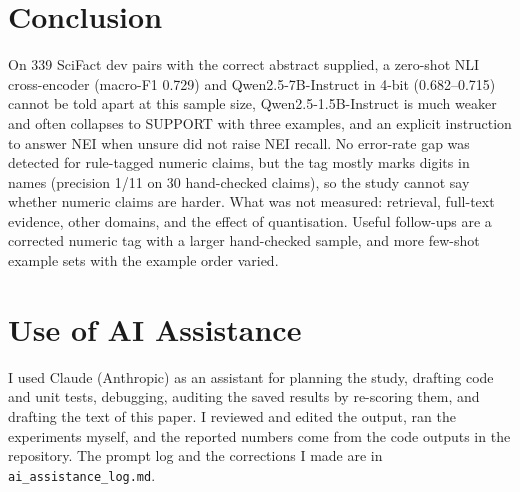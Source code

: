 \documentclass[conference]{IEEEtran}
\begin{document}
\section{Conclusion}
On 339 SciFact dev pairs with the correct abstract supplied, a zero-shot NLI cross-encoder (macro-F1 0.729) and Qwen2.5-7B-Instruct in 4-bit (0.682--0.715) cannot be told apart at this sample size, Qwen2.5-1.5B-Instruct is much weaker and often collapses to SUPPORT with three examples, and an explicit instruction to answer NEI when unsure did not raise NEI recall. No error-rate gap was detected for rule-tagged numeric claims, but the tag mostly marks digits in names (precision 1/11 on 30 hand-checked claims), so the study cannot say whether numeric claims are harder. What was not measured: retrieval, full-text evidence, other domains, and the effect of quantisation. Useful follow-ups are a corrected numeric tag with a larger hand-checked sample, and more few-shot example sets with the example order varied.

\section*{Use of AI Assistance}
I used Claude (Anthropic) as an assistant for planning the study, drafting code and unit tests, debugging, auditing the saved results by re-scoring them, and drafting the text of this paper. I reviewed and edited the output, ran the experiments myself, and the reported numbers come from the code outputs in the repository. The prompt log and the corrections I made are in \texttt{ai\_assistance\_log.md}.



\end{document}
